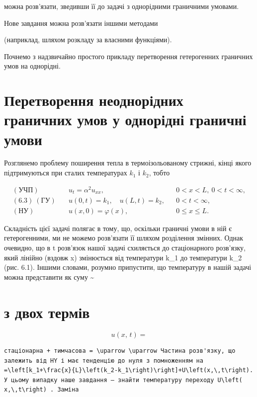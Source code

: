 \documentclass[
  ukrainian,
]{article}
\begin{document}
можна розв'язати, зведивши її до задачі з однорідними граничними
умовами.

Нове завдання можна розв'язати іншими методами

(наприклад, шляхом розкладу за власними функціями).

Почнемо з надзвичайно простого прикладу перетворення гетерогенних
граничних умов на однорідні.

\section{Перетворення неоднорідних граничних умов у однорідні граничні
умови}\label{ux43fux435ux440ux435ux442ux432ux43eux440ux435ux43dux43dux44f-ux43dux435ux43eux434ux43dux43eux440ux456ux434ux43dux438ux445-ux433ux440ux430ux43dux438ux447ux43dux438ux445-ux443ux43cux43eux432-ux443-ux43eux434ux43dux43eux440ux456ux434ux43dux456-ux433ux440ux430ux43dux438ux447ux43dux456-ux443ux43cux43eux432ux438-1}

Розглянемо проблему поширення тепла в термоізольованому стрижні, кінці
якого підтримуються при сталих температурах \(k_1\) і \(k_2\), тобто

\[
\begin{aligned}
(\text{УЧП})\quad & u_t = \alpha^2 u_{xx}, && 0 < x < L,\ 0 < t < \infty, \\
(6.3)\ (\text{ГУ})\quad & u(0,t) = k_1,\quad u(L,t) = k_2, && 0 < t < \infty, \\
(\text{НУ})\quad & u(x,0) = \varphi(x), && 0 \leqslant x \leqslant L.
\end{aligned}
\]

Складність цієї задачі полягає в тому, що, оскільки граничні умови в ній
є гетерогенними, ми не можемо розв'язати її шляхом розділення змінних.
Однак очевидно, що в t \to \infty розв'язок нашої задачі схиляється до
стаціонарного розв'язку, який лінійно (вздовж x) змінюється від
температури k\_1 до температури k\_2 (рис. 6.1). Іншими словами, розумно
припустити, що температуру в нашій задачі можна представити як суму
\textsubscript{}\textasciitilde{}

\section{з двох
термів}\label{ux437-ux434ux432ux43eux445-ux442ux435ux440ux43cux456ux432}

\[
u\left(x,\,t\right)=
\]

\begin{verbatim}
стаціонарна + тимчасова = \uparrow \uparrow Частина розв'язку, що залежить від HY і має тенденцію до нуля з помноженням на =\left[k_1+\frac{x}{L}\left(k_2-k_1\right)\right]+U\left(x,\,t\right). У цьому випадку наше завдання — знайти температуру переходу U\left( x,\,t\right) . Заміна
\end{verbatim}
\end{document}
